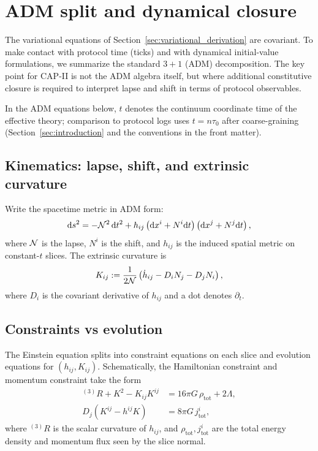 \section{ADM split and dynamical closure}
\label{sec:adm_closure}

The variational equations of Section~\ref{sec:variational_derivation} are covariant.
To make contact with protocol time (ticks) and with dynamical initial-value formulations, we summarize the standard $3+1$ (ADM) decomposition.
The key point for CAP-II is not the ADM algebra itself, but where additional constitutive closure is required to interpret lapse and shift in terms of protocol observables.
\par
\noindent In the ADM equations below, $t$ denotes the continuum coordinate time of the effective theory; comparison to protocol logs uses $t=n\tau_0$ after coarse-graining (Section~\ref{sec:introduction} and the conventions in the front matter).

\subsection{Kinematics: lapse, shift, and extrinsic curvature}
\label{subsec:adm_kinematics}

Write the spacetime metric in ADM form:
\begin{equation}
  \mathrm{d} s^2
  = -\mathcal{N}^2\,\mathrm{d} t^2
  + h_{ij}\left(\mathrm{d} x^i+N^i\mathrm{d} t\right)\left(\mathrm{d} x^j+N^j\mathrm{d} t\right),
  \label{eq:adm_metric_cap2}
\end{equation}
where $\mathcal{N}$ is the lapse, $N^i$ is the shift, and $h_{ij}$ is the induced spatial metric on constant-$t$ slices.
The extrinsic curvature is
\begin{equation}
  K_{ij}
  := \frac{1}{2\mathcal{N}}\left(\dot h_{ij}-D_i N_j-D_j N_i\right),
  \label{eq:extrinsic_curvature_cap2}
\end{equation}
where $D_i$ is the covariant derivative of $h_{ij}$ and a dot denotes $\partial_t$.

\subsection{Constraints vs evolution}
\label{subsec:constraints_evolution}

The Einstein equation splits into constraint equations on each slice and evolution equations for $(h_{ij},K_{ij})$.
Schematically, the Hamiltonian constraint and momentum constraint take the form
\begin{align}
  {}^{(3)}R + K^2 - K_{ij}K^{ij}
  &= 16\pi G\,\rho_{\mathrm{tot}} + 2\Lambda, \label{eq:ham_constraint_cap2}\\
  D_j\left(K^{ij}-h^{ij}K\right)
  &= 8\pi G\,j^i_{\mathrm{tot}}, \label{eq:mom_constraint_cap2}
\end{align}
where ${}^{(3)}R$ is the scalar curvature of $h_{ij}$, and $\rho_{\mathrm{tot}},j^i_{\mathrm{tot}}$ are the total energy density and momentum flux seen by the slice normal.

